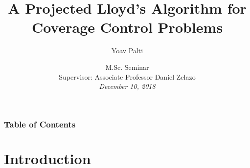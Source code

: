 \documentclass[t]{beamer}
\title{A Projected Lloyd’s Algorithm for Coverage Control Problems}
\author[Palti]
{Yoav Palti}
\institute[]
{Faculty of Aerospace Engineering, Technion - Israel Institude Of Technology}
\date[MSc Seminar]
{M.Sc. Seminar \\
Supervisor: Associate Professor Daniel Zelazo \\[1ex]
\footnotesize\em December 10, 2018}
\begin{document}
\begingroup
\renewcommand*\insertshorttitle{}
\renewcommand*\insertshortauthor{}
\renewcommand*\insertshortinstitute{}
\renewcommand*\dohead{\rule{0em}{1.45em}}
\begin{frame}[label=sl1]
  \titlepage
\end{frame}
\endgroup

\begin{frame}
\frametitle{Table of Contents}
\tableofcontents
\end{frame}


\section[Introduction]{Introduction}

\end{document}

